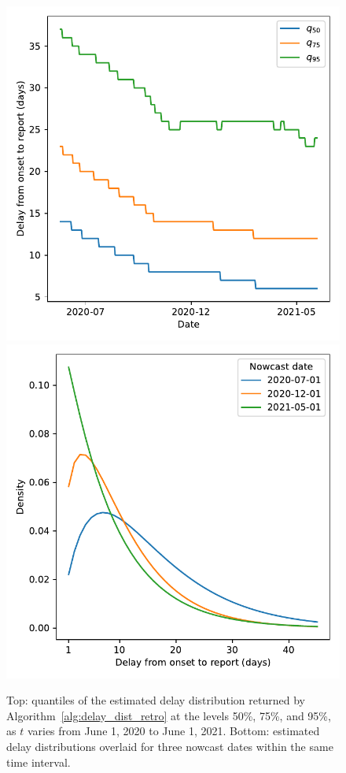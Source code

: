 \documentclass[sts]{imsart}
\theoremstyle{plain}
\theoremstyle{definition}
\theoremstyle{remark}
\begin{document}
\begin{figure}[tb]
\centering
\includegraphics[width=0.825\linewidth]{./figures/finalized_delay_quantiles.pdf}
\includegraphics[width=0.825\linewidth]{./figures/overlay_finalized_delay_dist.pdf}
\caption{Top: quantiles of the estimated delay distribution returned by 
  Algorithm~\ref{alg:delay_dist_retro} at the levels 50\%, 75\%, and 95\%, as 
  $t$ varies from June 1, 2020 to June 1, 2021. Bottom: estimated delay
  distributions overlaid for three nowcast dates within the same time
  interval.}    
	\label{fig:line_list_time}
\end{figure}
\end{document}

